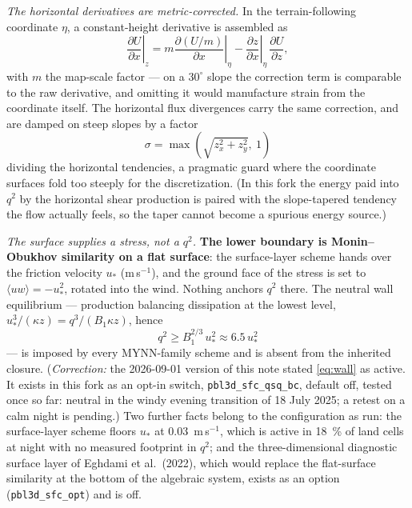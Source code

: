 \documentclass[10pt,a4paper]{article}
\newcommand{\keytag}[1]{\colorbox{keyc}{\textcolor{white}{\sffamily\bfseries\scriptsize K#1}}}
\newcommand{\key}[1]{\marginpar[\raggedleft\keytag{#1}]{\raggedright\keytag{#1}}\ignorespaces}
\newcommand{\kh}[1]{{\color{keyc!80!black}\bfseries #1}}
\newcommand{\avg}[1]{\langle #1 \rangle}
\newcommand{\pd}[2]{\frac{\partial #1}{\partial #2}}
\begin{document}
\emph{The horizontal derivatives are metric-corrected.} In the terrain-following coordinate $\eta$, a constant-height derivative is assembled as
\begin{equation}
\left.\pd{U}{x}\right|_{z}
 = m \left.\pd{(U/m)}{x}\right|_{\eta}
 - \left.\pd{z}{x}\right|_{\eta}\, \pd{U}{z},
\end{equation}
with $m$ the map-scale factor — on a $30^\circ$ slope the correction term is comparable to the raw derivative, and omitting it would manufacture strain from the coordinate itself. The horizontal flux divergences carry the same correction, and are damped on steep slopes by a factor
\begin{equation}
\sigma = \max\!\left( \sqrt{ z_x^2 + z_y^2 },\ 1 \right)
\end{equation}
dividing the horizontal tendencies, a pragmatic guard where the coordinate surfaces fold too steeply for the discretization. (In this fork the energy paid into $q^2$ by the horizontal shear production is paired with the slope-tapered tendency the flow actually feels, so the taper cannot become a spurious energy source.)

\key{8}\emph{The surface supplies a stress, not a $q^2$.} \kh{The lower boundary is Monin--Obukhov similarity on a flat surface}: the surface-layer scheme hands over the friction velocity $u_*$ (m\,s$^{-1}$), and the ground face of the stress is set to $\avg{uw} = -u_*^2$, rotated into the wind. Nothing anchors $q^2$ there. The neutral wall equilibrium — production balancing dissipation at the lowest level, $u_*^3/(\kappa z) = q^3/(B_1 \kappa z)$, hence
\begin{equation}
q^2 \ge B_1^{2/3}\, u_*^2 \approx 6.5\,u_*^2
\label{eq:wall}
\end{equation}
— is imposed by every MYNN-family scheme and is absent from the inherited closure. (\emph{Correction:} the 2026-09-01 version of this note stated \eqref{eq:wall} as active. It exists in this fork as an opt-in switch, \texttt{pbl3d\_sfc\_qsq\_bc}, default off, tested once so far: neutral in the windy evening transition of 18 July 2025; a retest on a calm night is pending.) Two further facts belong to the configuration as run: the surface-layer scheme floors $u_*$ at 0.03~m\,s$^{-1}$, which is active in 18~\% of land cells at night with no measured footprint in $q^2$; and the three-dimensional diagnostic surface layer of Eghdami et al.\ (2022), which would replace the flat-surface similarity at the bottom of the algebraic system, exists as an option (\texttt{pbl3d\_sfc\_opt}) and is off.
\end{document}
